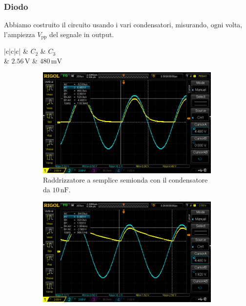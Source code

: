\documentclass[a4paper]{article}
\begin{document}
{{			\subsubsection{Diodo}
				Abbiamo costruito il circuito usando i vari condensatori, misurando, ogni volta, l'ampiezza $ V_{\mathrm{pp}} $ del segnale in output.
				\begin{center}
					\begin{tabular}{ |c|c|c| }
						\hline
						 & \textbf{$ C_{2} $} & \textbf{$ C_{3} $} \\
						\hline
						 & $ 2.56 \, \mathrm{V} $ & $ 480 \, \mathrm{mV} $ \\
						\hline
					\end{tabular}
				\end{center}
				\begin{figure}[h!]
					\centering
					\begin{subfigure}{0.4\textwidth}
						\centering
						\includegraphics[scale=0.2]{raddrizzatoreASempliceSemiondaDiodo10n}
						\caption{Raddrizzatore a semplice semionda con il condensatore da $ 10 \, \mathrm{nF} $.}
					\end{subfigure}
					\begin{subfigure}{0.4\textwidth}
						\centering
						\includegraphics[scale=0.2]{raddrizzatoreASempliceSemiondaDiodo100n}

\end{subfigure}
\end{figure}}}
\end{document}
